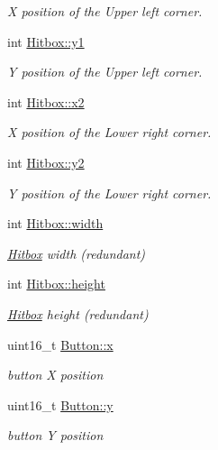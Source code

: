 \begin{DoxyCompactItemize}
\begin{DoxyCompactList}\small\item\em X position of the Upper left corner. \end{DoxyCompactList}\item 
int \mbox{\hyperlink{group__sprite_gae4b2bb3a226633c413ecc01795f1dec9}{Hitbox\+::y1}}
\begin{DoxyCompactList}\small\item\em Y position of the Upper left corner. \end{DoxyCompactList}\item 
int \mbox{\hyperlink{group__sprite_ga5e8a3444550e7d6219148cdf421068b8}{Hitbox\+::x2}}
\begin{DoxyCompactList}\small\item\em X position of the Lower right corner. \end{DoxyCompactList}\item 
int \mbox{\hyperlink{group__sprite_ga4786580e4912ad08c39f12150bdde84f}{Hitbox\+::y2}}
\begin{DoxyCompactList}\small\item\em Y position of the Lower right corner. \end{DoxyCompactList}\item 
int \mbox{\hyperlink{group__sprite_ga1eddadd54a3cd0e831f55c322892e687}{Hitbox\+::width}}
\begin{DoxyCompactList}\small\item\em \mbox{\hyperlink{struct_hitbox}{Hitbox}} width (redundant) \end{DoxyCompactList}\item 
int \mbox{\hyperlink{group__sprite_ga4510d5b903afe522c6b1e964016d988c}{Hitbox\+::height}}
\begin{DoxyCompactList}\small\item\em \mbox{\hyperlink{struct_hitbox}{Hitbox}} height (redundant) \end{DoxyCompactList}\item 
uint16\+\_\+t \mbox{\hyperlink{group__sprite_ga7e12fd65ad1fdbd19721a3c109efd3bf}{Button\+::x}}
\begin{DoxyCompactList}\small\item\em button X position \end{DoxyCompactList}\item 
uint16\+\_\+t \mbox{\hyperlink{group__sprite_ga0e057db96fd0683cd5236af8921671a6}{Button\+::y}}
\begin{DoxyCompactList}\small\item\em button Y position \end{DoxyCompactList}\item 

\end{DoxyCompactItemize}
